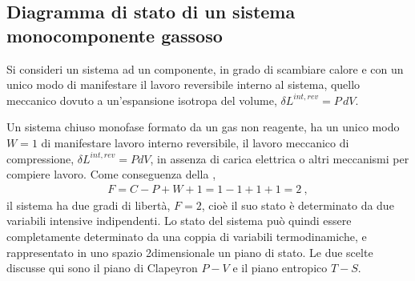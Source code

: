 \documentclass[letterpaper,10pt,italian]{jupyterBook}
\begin{document}
\subsection{Diagramma di stato di un sistema mono\sphinxhyphen{}componente gassoso}
\label{\detokenize{ch/thermodynamics/principles-phase-diagrams:diagramma-di-stato-di-un-sistema-mono-componente-gassoso}}\label{\detokenize{ch/thermodynamics/principles-phase-diagrams:physics-hs-thermodynamics-foundation-principles-phase-diagrams-gas-1}}
\sphinxAtStartPar
Si consideri un sistema ad un componente, in grado di scambiare calore e con un unico modo di manifestare il lavoro reversibile interno al sistema, quello meccanico dovuto a un’espansione isotropa del volume, \(\delta L^{int,rev} = P \, d V\).

\sphinxAtStartPar
Un sistema chiuso monofase formato da un gas non reagente, ha un unico modo \(W=1\) di manifestare lavoro interno reversibile, il lavoro meccanico di compressione, \(\delta L^{int,rev} = P dV\), in assenza di carica elettrica o altri meccanismi per compiere lavoro. Come conseguenza della {\hyperref[\detokenize{ch/thermodynamics/principles-gibbs-phase-rule:physics-hs-thermodynamics-foundation-principles-gibbs-phase-rule-gibbs-phase-rule}]{}},
\begin{equation*}
\begin{split}F = C - P + W + 1 = 1 - 1 + 1 + 1 = 2 \ ,\end{split}
\end{equation*}
\sphinxAtStartPar
il sistema ha due gradi di libertà, \(F=2\), cioè il suo stato è determinato da due variabili intensive indipendenti. Lo stato del sistema può quindi essere completamente determinato da una coppia di variabili termodinamiche, e rappresentato in uno spazio 2\sphinxhyphen{}dimensionale \sphinxhyphen{} un piano di stato.
Le due scelte discusse qui sono il piano di Clapeyron \(P-V\) e il piano entropico \(T-S\).
\end{document}
